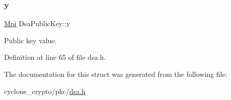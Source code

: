 \subsubsection{\texorpdfstring{y}{y}}
{\footnotesize\ttfamily \hyperlink{structMpi}{Mpi} Dsa\+Public\+Key\+::y}



Public key value. 



Definition at line 65 of file dsa.\+h.



The documentation for this struct was generated from the following file\+:\begin{DoxyCompactItemize}
\item 
cyclone\+\_\+crypto/pkc/\hyperlink{dsa_8h}{dsa.\+h}\end{DoxyCompactItemize}
